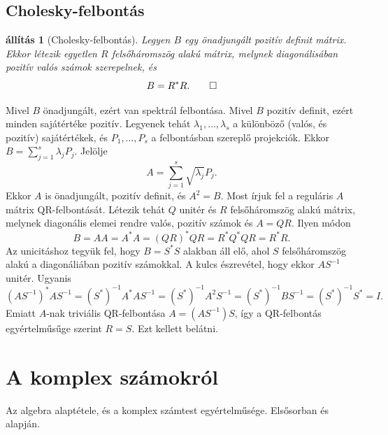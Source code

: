 \documentclass[a4paper, showtrims]{memoir}
\makeatletter
\renewenvironment{proof}[1][\proofname]
    {\par\pushQED{\qed}%
    \normalfont \topsep6\p@\@plus6\p@\relax
    \trivlist
    \item[\hskip\labelsep
        \itshape
    #1\@addpunct{:}]\ignorespaces}
    {\popQED\endtrivlist\@endpefalse}
\theoremstyle{plain}
\newtheorem{proposition}{állítás}[chapter]
\theoremstyle{remark}
\theoremstyle{definition}
\makeatother
\begin{document}
\section{Cholesky-felbontás}
\begin{proposition}[Cholesky-felbontás]
    Legyen $B$ egy önadjungált pozitív definit mátrix. 
    Ekkor létezik egyetlen $R$ felsőháromszög alakú mátrix, 
    melynek diagonálisában pozitív valós számok szerepelnek, és
    \[
    B=R^\ast R.\qedhere
    \]
\end{proposition}
\begin{proof}
    Mivel $B$ önadjungált, ezért van spektrál felbontása.
    Mivel $B$ pozitív definit, ezért minden sajátértéke pozitív.
    Legyenek tehát $\lambda_1,\dots,\lambda_s$ a különböző (valós, és pozitív) sajátértékek,
    és $P_1,\dots,P_s$ a felbontásban szereplő projekciók. 
    Ekkor $B=\sum_{j=1}^s\lambda_jP_j$. Jelölje 
    \[
        A=\sum_{j=1}^s\sqrt{\lambda_j}P_j.
    \]
    Ekkor $A$ is önadjungált, pozitív definit, és $A^2=B$.
    Most írjuk fel a reguláris $A$ mátrix QR-felbontását.
    Létezik tehát $Q$ unitér és $R$ felsőháromszög alakú mátrix, melynek diagonális elemei
    rendre valós, pozitív számok és $A=QR$.
    Ilyen módon
    \[
    B=AA=A^\ast A=\left( QR \right)^\ast QR=R^\ast Q^\ast QR=R^\ast R.
    \]
    Az unicitáshoz tegyük fel, hogy $B=S^\ast S$ alakban áll elő,
    ahol $S$ felsőháromszög alakú a diagonáliában pozitív számokkal.
    A kulcs észrevétel, hogy ekkor $AS^{-1}$ unitér.
    Ugyanis
    \[
        \left( AS^{-1} \right)^\ast AS^{-1}
        =
        (S^\ast)^{-1}A^\ast AS^{-1}
        =
        (S^\ast)^{-1}A^2S^{-1}
        =
        (S^\ast)^{-1}BS^{-1}
        =
        (S^\ast)^{-1}S^\ast
        =
        I.
    \]
    Emiatt $A$-nak triviális QR-felbontása $A=\left( AS^{-1} \right)S$,
    így a QR-felbontás egyértelműsűge szerint $R=S$.
    Ezt kellett belátni. 
\end{proof}

\appendix
\renewcommand{\chaptername}{függelék}
\renewcommand{\appendixpagename}{Függelékek}\renewcommand{\appendixtocname}{\appendixpagename}
\appendixpage

\chapter{A komplex számokról}
Az algebra alaptétele, és a komplex számtest egyértelműsége. Elsősorban \parencite{MR1415833} és \parencite{10.2307/3647746} alapján.
\end{document}
